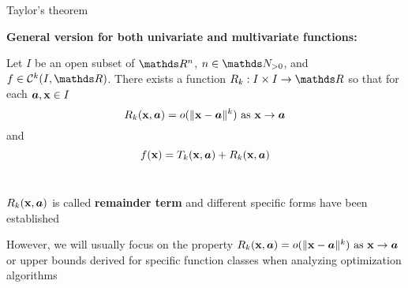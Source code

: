 \documentclass[11pt,compress,t,notes=noshow, xcolor=table]{beamer}
\begin{document}
\begin{framei}{Taylor's theorem}
    \item[] \textbf{General version for both univariate and multivariate functions:}

    Let $I$ be an open subset of $\R^n$, $n\in\N_{>0}$, and $f \in \mathcal{C}^k(I,\R)$.
    There exists a function $R_k:I\times I\rightarrow \R$ so that for each $\bm{a},\mathbf{x} \in I$
    $$
    R_k(\mathbf{x}, \bm{a}) = {o}(\|\mathbf{x}-\bm{a}\|^k) \text{ as } \mathbf{x} \to \bm{a}
    $$
    and 
    $$
    f(\mathbf{x}) =T_k(\mathbf{x}, \bm{a})+ R_k(\mathbf{x}, \bm{a})
    $$\,\\

    \item $R_k(\mathbf{x}, \bm{a})$ is called \textbf{remainder term} and different specific forms have been established
    \item However, we will usually focus on the property $R_k(\mathbf{x}, \bm{a}) = {o}(\|\mathbf{x}-\bm{a}\|^k) \text{ as } \mathbf{x} \to \bm{a}$ or upper bounds derived for specific function classes when analyzing optimization algorithms
\end{framei}



\end{document}
